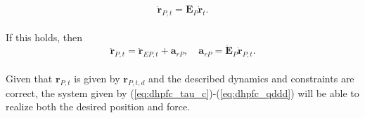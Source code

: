 \begin{equation}
    \mathbf{\dot{r}}_{P,t} = \mathbf{E}_P \mathbf{\dot{r}}_t.
\end{equation}
\\
If this holds, then
\begin{equation}
    \mathbf{\ddot{r}}_{P,t} = \mathbf{\ddot{r}}_{EP,t} + \mathbf{a}_{rP}, \quad \mathbf{a}_{rP} = \mathbf{\dot{E}}_P \mathbf{\dot{r}}_{P,t}.
\end{equation}
\\
Given that $\mathbf{r}_{P,t}$ is given by $\mathbf{r}_{P,t,d}$ and the described dynamics and constraints are correct, the system given by (\ref{eq:dhpfc_tau_c})-(\ref{eq:dhpfc_qddd}) will be able to realize both the desired position and force.





%


